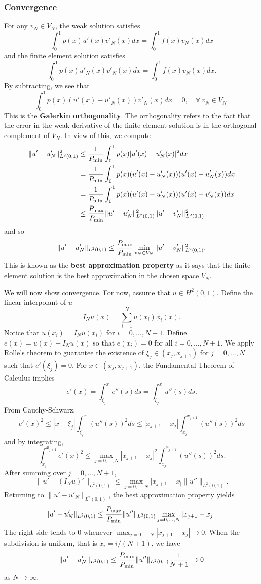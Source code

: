 \documentclass{article}
\theoremstyle{definition}
\theoremstyle{definition}
\begin{document}
\subsubsection{Convergence}
For any $v_N\in V_N$, the weak solution satisfies
$$\int_{0}^{1}p(x)u'(x)v'_N(x)dx=\int_{0}^{1}f(x)v_N(x)dx$$
and the finite element solution satisfies
$$\int_{0}^{1}p(x)u'_N(x)v'_N(x)dx=\int_{0}^{1}f(x)v_N(x)dx.$$
By subtracting, we see that
$$\int_{0}^{1}p(x)(u'(x)-u'_N(x))v'_N(x)dx=0,\quad \forall\:v_N\in V_N.$$
This is the \textbf{Galerkin orthogonality}. The orthogonality refers to the fact that the error in the weak derivative of the finite element solution is in the orthogonal complement of $V_N$. In view of this, we compute
\begin{align*}
    \|u'-u'_N\|^2_{L^2(0,1)}&\leq \frac{1}{P_{\rm min}}\int_{0}^{1}p(x)|u'(x)-u'_N(x)|^2dx \\
    &=\frac{1}{P_{\rm min}}\int_{0}^{1}p(x)(u'(x)-u'_N(x))(u'(x)-u'_N(x))dx  \\
    &=\frac{1}{P_{\rm min}}\int_{0}^{1}p(x)(u'(x)-u'_N(x))(u'(x)-v'_N(x))dx  \\
    &\leq \frac{P_{\rm max}}{P_{\rm min}}\|u'-u'_N\|^2_{L^2(0,1)}\|u'-v'_N\|^2_{L^2(0,1)}
\end{align*}
and so
$$\|u'-u'_N\|_{L^2(0,1)}\leq \frac{P_{\rm max}}{P_{\rm min}} \min_{v_N\in V_N}\|u'-v'_N\|^2_{L^2(0,1)}.$$
This is known as the \textbf{best approximation property} as it says that the finite element solution is the best approximation in the chosen space $V_N$.

We will now show convergence. For now, assume that $u\in H^2(0,1)$. Define the linear interpolant of $u$
$$I_Nu(x)=\sum_{i=1}^{N}u(x_i)\phi_i(x).$$
Notice that $u(x_i)=I_Nu(x_i)$ for $i=0,\ldots,N+1$. Define $e(x)=u(x)-I_Nu(x)$ so that $e(x_i)=0$ for all $i=0,\ldots,N+1$. We apply Rolle's theorem to guarantee the existence of $\xi_j\in (x_j,x_{j+1})$ for $j=0,\ldots,N$ such that $e'(\xi_j)=0$. For $x\in (x_j,x_{j+1})$, the Fundamental Theorem of Calculus implies
$$e'(x)=\int_{\xi_j}^{x}e''(s)ds=\int_{\xi_j}^{x}u''(s)ds.$$
From Cauchy-Schwarz,
$$e'(x)^2\leq |x-\xi_j|\int_{\xi_j}^{x}(u''(s))^2ds\leq |x_{j+1}-x_j|\int_{x_j}^{x_{j+1}}(u''(s))^2ds$$
and by integrating,
$$\int_{x_j}^{x_{j+1}}e'(x)^2\leq \max_{j=0,\ldots,N}|x_{j+1}-x_j|^2\int_{x_j}^{x_{j+1}}(u''(s))^2ds.$$
After summing over $j=0,\ldots,N+1$,
$$\|u'-(I_Nu)'\|_{L^2(0,1)}\leq \max_{j=0,\ldots,N}|x_{j+1}-x_| \|u''\|_{L^2(0,1)}.$$
Returning to $\|u'-u'_N\|_{L^2(0,1)}$, the best approximation property yields
$$\|u'-u'_N\|_{L^2(0,1)}\leq \frac{P_{\rm max}}{P_{\rm min}}\|u''\|_{L^2(0,1)}\max_{j=0,\ldots,N}|x_{j+1}-x_j|.$$
The right side tends to $0$ whenever $\max_{j=0,\ldots,N}|x_{j+1}-x_j|\to 0$. When the subdivision is uniform, that is $x_i=i/(N+1)$, we have
$$\|u'-u'_N\|_{L^2(0,1)}\leq \frac{P_{\rm max}}{P_{\rm min}}\|u''\|_{L^2(0,1)}\frac{1}{N+1}\to 0$$
as $N\to \infty$.
\end{document}
